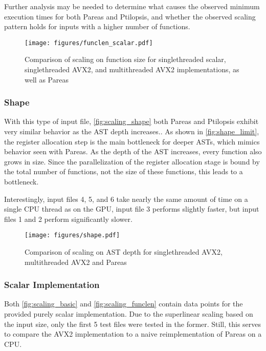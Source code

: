 \documentclass[11pt,dvipsnames]{article}
\begin{document}
Further analysis may be needed to determine what causes the observed minimum execution times for both Pareas and Ptilopsis, and whether the observed scaling pattern holds for inputs with a higher number of functions.

\begin{figure}[ht]
    \centering
    \texttt{[image: figures/funclen\_scalar.pdf]}
    \caption{Comparison of scaling on function size for singlethreaded scalar, singlethreaded AVX2, and multithreaded AVX2 implementations, as well as Pareas}
    \label{fig:scaling_funclen}
\end{figure}

\subsubsection*{Shape}
With this type of input file, \autoref{fig:scaling_shape} both Pareas and Ptilopsis exhibit very similar behavior as the AST depth increases.. As shown in \autoref{fig:shape_limit}, the register allocation step is the main bottleneck for deeper ASTs, which mimics behavior seen with Pareas. As the depth of the AST increases, every function also grows in size. Since the parallelization of the register allocation stage is bound by the total number of functions, not the size of these functions, this leads to a bottleneck.

Interestingly, input files 4, 5, and 6 take nearly the same amount of time on a single CPU thread as on the GPU, input file 3 performs slightly faster, but input files 1 and 2 perform significantly slower.

\begin{figure}[!h]
    \centering
    \texttt{[image: figures/shape.pdf]}
    \caption{Comparison of scaling on AST depth for singlethreaded AVX2, multithreaded AVX2 and Pareas}
    \label{fig:scaling_shape}
\end{figure}

\subsubsection{Scalar Implementation}
Both \autoref{fig:scaling_basic} and \autoref{fig:scaling_funclen} contain data points for the provided purely scalar implementation. Due to the superlinear scaling based on the input size, only the first 5 test files were tested in the former. Still, this serves to compare the AVX2 implementation to a naive reimplementation of Pareas on a CPU.
\end{document}
